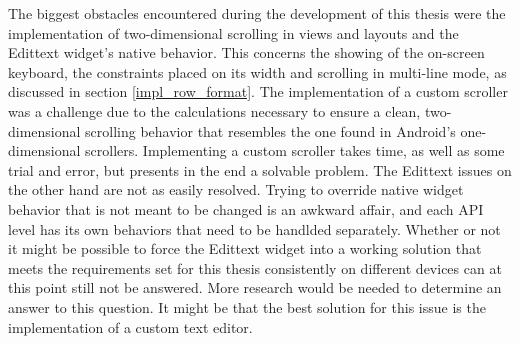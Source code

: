 The biggest obstacles encountered during the development of this thesis were the implementation of two-dimensional scrolling in views and layouts and the Edittext widget's native behavior. This concerns the showing of the on-screen keyboard, the constraints placed on its width and scrolling in multi-line mode, as discussed in section \ref{impl_row_format}. The implementation of a custom scroller was a challenge due to the calculations necessary to ensure a clean, two-dimensional scrolling behavior that resembles the one found in Android's one-dimensional scrollers. Implementing a custom scroller takes time, as well as some trial and error, but presents in the end a solvable problem. The Edittext issues on the other hand are not as easily resolved. Trying to override native widget behavior that is not meant to be changed is an awkward affair, and each \gls{API} level has its own behaviors that need to be handlded separately. Whether or not it might be possible to force the Edittext widget into a working solution that meets the requirements set for this thesis consistently on different devices can at this point still not be answered. More research would be needed to determine an answer to this question. It might be that the best solution for this issue is the implementation of a custom text editor. 